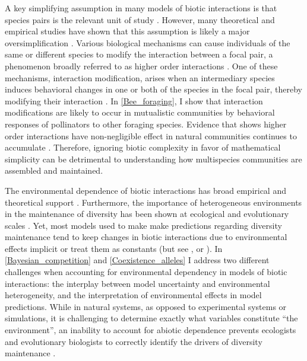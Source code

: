 \begin{refsection}
A key simplifying assumption in many models of biotic interactions is that species pairs is the relevant unit of study \citep{levine_beyond_2017}. However, many theoretical and empirical studies have shown that this assumption is likely a major oversimplification \citep{abrams1983arguments,billick_higher_1994,mayfield2017higher,letten_mechanistic_2019}. Various biological mechanisms can cause individuals of the same or different species to modify the interaction between a focal pair, a phenomenon broadly referred to as higher order interactions \citep{kleinhesselink2019mechanisms}. One of these mechanisms, interaction modification, arises when an intermediary species induces behavioral changes in one or both of the species in the focal pair, thereby modifying their interaction \citep{adler_general_1994, billick_higher_1994}. In \autoref{Bee_foraging}, I show that interaction modifications are likely to occur in mutualistic communities by behavioral responses of pollinators to other foraging species. Evidence that shows higher order interactions have non-negligible effect in natural communities continues to accumulate \citep{mayfield2017higher,martyn2021identifying,lai2020role,levine_beyond_2017}. Therefore, ignoring biotic complexity in favor of mathematical simplicity can be detrimental to understanding how multispecies communities are assembled and maintained.

 The environmental dependence of biotic interactions has broad empirical and theoretical support \citep{callaway_positive_2002,chamberlain_how_2014,lanuza_opposing_2018,chesson2000mechanisms,tylianakis2008global,bimler_accurate_2018}. Furthermore, the importance of heterogeneous environments in the maintenance of diversity has been shown at ecological \citep{amarasekare2003competitive,kneitel2004trade} and evolutionary scales \citep{connallon_evolutionary_2019,ellner1994role,dean2005protecting}. Yet, most models used to make make predictions regarding diversity maintenance tend to keep changes in biotic interactions due to environmental effects implicit or treat them as constants (but see \citet{bimler_accurate_2018}, or \citet{connallon_evolutionary_2019}). In \autoref{Bayesian_competition} and \autoref{Coexistence_alleles} I address two different challenges when accounting for environmental dependency in models of biotic interactions: the interplay between model uncertainty and environmental heterogeneity, and the interpretation of environmental effects in model predictions. While in natural systems, as opposed to experimental systems or simulations, it is challenging to determine exactly what variables constitute ``the environment'', an inability to account for abiotic dependence prevents ecologists and evolutionary biologists to correctly identify the drivers of diversity maintenance \citep{freckleton2009measuring, connallon_evolutionary_2019}.



\end{refsection}
